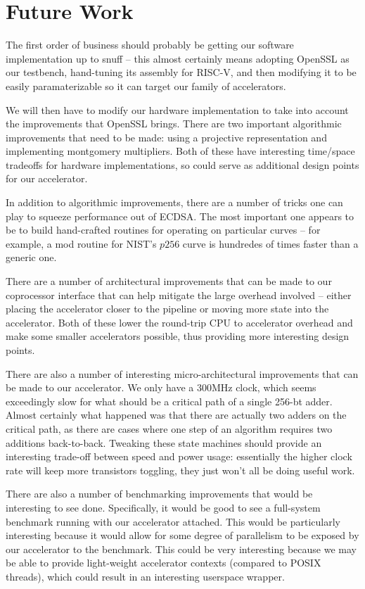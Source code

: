 \documentclass[twocolumn]{article}
\begin{document}
\section{Future Work}

The first order of business should probably be getting our software
implementation up to snuff -- this almost certainly means adopting
OpenSSL as our testbench, hand-tuning its assembly for RISC-V, and
then modifying it to be easily paramaterizable so it can target our
family of accelerators.

We will then have to modify our hardware implementation to take into
account the improvements that OpenSSL brings.  There are two important
algorithmic improvements that need to be made: using a projective
representation and implementing montgomery multipliers.  Both of these
have interesting time/space tradeoffs for hardware implementations, so
could serve as additional design points for our accelerator.

In addition to algorithmic improvements, there are a number of tricks
one can play to squeeze performance out of ECDSA.  The most important
one appears to be to build hand-crafted routines for operating on
particular curves -- for example, a mod routine for NIST's $p256$
curve is hundredes of times faster than a generic
one\cite{nist-routines}.

There are a number of architectural improvements that can be made to
our coprocessor interface that can help mitigate the large overhead
involved -- either placing the accelerator closer to the pipeline or
moving more state into the accelerator.  Both of these lower the
round-trip CPU to accelerator overhead and make some smaller
accelerators possible, thus providing more interesting design points.

There are also a number of interesting micro-architectural
improvements that can be made to our accelerator.  We only have a
300MHz clock, which seems exceedingly slow for what should be a
critical path of a single 256-bt adder.  Almost certainly what
happened was that there are actually two adders on the critical path,
as there are cases where one step of an algorithm requires two
additions back-to-back.  Tweaking these state machines should provide
an interesting trade-off between speed and power usage: essentially
the higher clock rate will keep more transistors toggling, they just
won't all be doing useful work.

There are also a number of benchmarking improvements that would be
interesting to see done.  Specifically, it would be good to see a
full-system benchmark running with our accelerator attached.  This
would be particularly interesting because it would allow for some
degree of parallelism to be exposed by our accelerator to the
benchmark.  This could be very interesting because we may be able to
provide light-weight accelerator contexts (compared to POSIX threads),
which could result in an interesting userspace wrapper.



\end{document}
